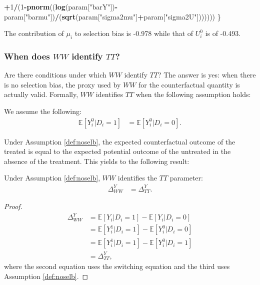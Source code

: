 \documentclass[]{book}
\newenvironment{Shaded}{\begin{snugshade}}{\end{snugshade}}
\newcommand{\DecValTok}[1]{\textcolor[rgb]{0.00,0.00,0.81}{#1}}
\newcommand{\KeywordTok}[1]{\textcolor[rgb]{0.13,0.29,0.53}{\textbf{#1}}}
\newcommand{\NormalTok}[1]{#1}
\newcommand{\OperatorTok}[1]{\textcolor[rgb]{0.81,0.36,0.00}{\textbf{#1}}}
\newcommand{\StringTok}[1]{\textcolor[rgb]{0.31,0.60,0.02}{#1}}
\newcommand{\esp}[1]{\mathbb{E}[ #1 ]}
\theoremstyle{definition}
\theoremstyle{definition}
\theoremstyle{definition}
\theoremstyle{remark}
\let\BeginKnitrBlock\begin \let\EndKnitrBlock\end
\begin{document}
\begin{Shaded}
\begin{Highlighting}[]
           \OperatorTok{+}\DecValTok{1}\OperatorTok{/}\NormalTok{(}\DecValTok{1}\OperatorTok{-}\KeywordTok{pnorm}\NormalTok{((}\KeywordTok{log}\NormalTok{(param[}\StringTok{"barY"}\NormalTok{])}\OperatorTok{-}\NormalTok{param[}\StringTok{"barmu"}\NormalTok{])}\OperatorTok{/}\NormalTok{(}\KeywordTok{sqrt}\NormalTok{(param[}\StringTok{"sigma2mu"}\NormalTok{]}\OperatorTok{+}\NormalTok{param[}\StringTok{"sigma2U"}\NormalTok{]))))))}
\NormalTok{\}}
\end{Highlighting}
\end{Shaded}

The contribution of \(\mu_i\) to selection bias is -0.978 while that of \(U_i^0\) is of -0.493.

\hypertarget{when-does-ww-identify-tt}{%
\subsubsection{\texorpdfstring{When does \(WW\) identify \(TT\)?}{When does WW identify TT?}}\label{when-does-ww-identify-tt}}

Are there conditions under which \(WW\) identify \(TT\)?
The answer is yes: when there is no selection bias, the proxy used by \(WW\) for the counterfactual quantity is actually valid.
Formally, \(WW\) identifies \(TT\) when the following assumption holds:

\BeginKnitrBlock{definition}[No selection bias]
\protect\hypertarget{def:noselb}{}{\label{def:noselb} \iffalse (No selection bias) \fi{} }We assume the following:
\begin{align*}
\esp{Y_i^0|D_i=1} & = \esp{Y_i^0|D_i=0}.
\end{align*}
\EndKnitrBlock{definition}

Under Assumption \ref{def:noselb}, the expected counterfactual outcome of the treated is equal to the expected potential outcome of the untreated in the absence of the treatment.
This yields to the following result:

\BeginKnitrBlock{theorem}
\protect\hypertarget{thm:wwtt}{}{\label{thm:wwtt} }Under Assumption \ref{def:noselb}, \(WW\) identifies the \(TT\) parameter:
\begin{align*}
\Delta^Y_{WW} & = \Delta^Y_{TT}.
\end{align*}
\EndKnitrBlock{theorem}

\BeginKnitrBlock{proof}
\iffalse{} {Proof. } \fi{}\begin{align*}
\Delta^Y_{WW} & = \esp{Y_i|D_i=1}-\esp{Y_i|D_i=0}\\
              & = \esp{Y_i^1|D_i=1}-\esp{Y_i^0|D_i=0}\\
              & = \esp{Y_i^1|D_i=1}-\esp{Y_i^0|D_i=1} \\
              & = \Delta^Y_{TT},
\end{align*}
where the second equation uses the switching equation and the third uses Assumption \ref{def:noselb}.
\EndKnitrBlock{proof}
\end{document}
